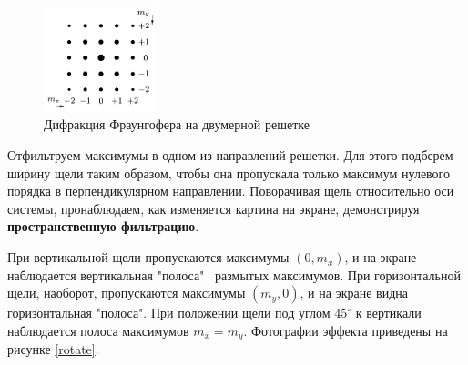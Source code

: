 \documentclass[12pt]{kiarticle} %
\begin{document}
	\begin{figure}[h]
		\centering	
		\includegraphics[width=0.3\textwidth]{2d.png}
		\caption{Дифракция Фраунгофера на двумерной решетке}
		\label{2d}
	\end{figure}
	
	Отфильтруем максимумы в одном из направлений решетки. Для этого подберем ширину щели таким образом, чтобы она пропускала только максимум нулевого порядка в перпендикулярном направлении. Поворачивая щель относительно оси системы, пронаблюдаем, как изменяется картина на экране, демонстрируя \textbf{пространственную фильтрацию}. 
	
	При вертикальной щели пропускаются максимумы $(0, m_x)$, и на экране наблюдается вертикальная "полоса" \ размытых максимумов. При горизонтальной щели, наоборот, пропускаются максимумы $(m_y, 0)$, и на экране видна горизонтальная "полоса". При положении щели под углом $45^\circ$ к вертикали наблюдается полоса максимумов $m_x = m_y$. Фотографии эффекта приведены на рисунке \ref{rotate}. 
	
\end{document}
